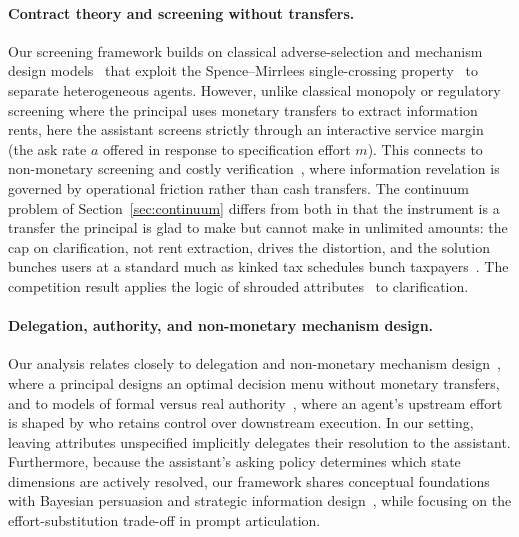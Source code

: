 \documentclass[11pt]{article}
\begin{document}
\paragraph{Contract theory and screening without transfers.}
Our screening framework builds on classical adverse-selection and mechanism design models~\citep{mirrlees1971,myerson1979,myerson1981,baron-myerson1982,mussa-rosen1978,laffont-tirole1986} that exploit the Spence--Mirrlees single-crossing property~\citep{spence1973} to separate heterogeneous agents. However, unlike classical monopoly or regulatory screening where the principal uses monetary transfers to extract information rents, here the assistant screens strictly through an interactive service margin (the ask rate $a$ offered in response to specification effort $m$). This connects to non-monetary screening and costly verification~\citep{townsend1979,ben-porath2014}, where information revelation is governed by operational friction rather than cash transfers. The continuum problem of Section~\ref{sec:continuum} differs from both in that the instrument is a transfer the principal is glad to make but cannot make in unlimited amounts: the cap on clarification, not rent extraction, drives the distortion, and the solution bunches users at a standard much as kinked tax schedules bunch taxpayers~\citep{saez2010}. The competition result applies the logic of shrouded attributes~\citep{gabaix-laibson2006} to clarification.

\paragraph{Delegation, authority, and non-monetary mechanism design.}
Our analysis relates closely to delegation and non-monetary mechanism design~\citep{holmstrom1984,dessein2002,alonso-matouschek2008,armstrong-vickers2010,ambrus-egorov2017}, where a principal designs an optimal decision menu without monetary transfers, and to models of formal versus real authority~\citep{aghion-tirole1997}, where an agent's upstream effort is shaped by who retains control over downstream execution. In our setting, leaving attributes unspecified implicitly delegates their resolution to the assistant. Furthermore, because the assistant's asking policy determines which state dimensions are actively resolved, our framework shares conceptual foundations with Bayesian persuasion and strategic information design~\citep{kamenica-gentzkow2011}, while focusing on the effort-substitution trade-off in prompt articulation.
\end{document}
